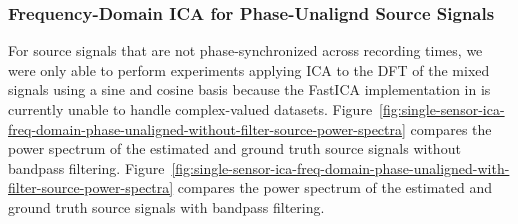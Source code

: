 \documentclass[10pt]{article}
\begin{document}
\subsubsection*{Frequency-Domain ICA for Phase-Unalignd Source Signals}
For source signals that are not phase-synchronized across recording times, we were only
able to perform experiments applying ICA to the DFT of the mixed signals using a sine and
cosine basis because the FastICA implementation in  is currently unable
to handle complex-valued datasets.
Figure~\ref{fig:single-sensor-ica-freq-domain-phase-unaligned-without-filter-source-power-spectra}
compares the power spectrum of the estimated and ground truth source signals without
bandpass filtering.
Figure~\ref{fig:single-sensor-ica-freq-domain-phase-unaligned-with-filter-source-power-spectra}
compares the power spectrum of the estimated and ground truth source signals with bandpass
filtering.
\end{document}
